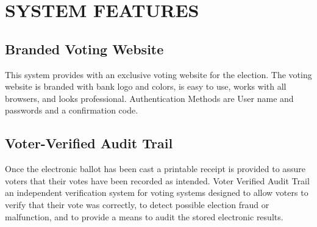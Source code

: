 \documentclass[12pt,a4paper,oneside]{report}
\begin{document}
\chapter{SYSTEM FEATURES}
\section{Branded Voting Website}
\par
This system provides with an exclusive voting website for the election. The voting website is branded with bank logo and colors, is easy to use, works with all browsers, and looks professional. Authentication Methods are User name and passwords and a confirmation code. 
\section{Voter-Verified Audit Trail}
\par
Once the electronic ballot has been cast a printable receipt is provided to assure voters that their votes have been recorded as intended. Voter Verified Audit Trail an independent verification system for voting systems designed to allow voters to verify that their vote was correctly, to detect possible election fraud or malfunction, and to provide a means to audit the stored electronic results.
\end{document}
